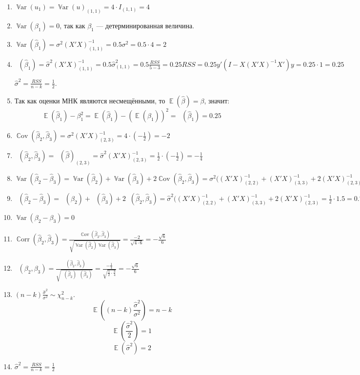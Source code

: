 \documentclass[12pt]{article}
\DeclareMathOperator{\Cov}{\mathbb{C}ov}
\DeclareMathOperator{\Corr}{\mathbb{C}orr}
\DeclareMathOperator{\Var}{\mathbb{V}ar}
\DeclareMathOperator{\hVar}{\widehat{\Var}}
\DeclareMathOperator{\hCov}{\widehat{\Cov}}
\DeclareMathOperator{\hCorr}{\widehat{\Corr}}
\DeclareMathOperator{\E}{\mathbb{E}}
\newcommand{\hb}{\hat{\beta}}
\newcommand{\RSS}{RSS}
\begin{document}
\begin{problem}
\begin{sol}
\begin{enumerate}
\item $\Var(u_1)=\Var(u)_{(1,1)}=4\cdot I_{(1,1)}=4$
\item $\Var(\beta_1)=0$, так как $\beta_1$ — детерминированная величина.
\item $\Var(\hb_1)=\sigma^2(X'X)^{-1}_{(1,1)}=0.5\sigma^2=0.5\cdot 4=2$
\item $\hVar(\hb_1)=\hat\sigma^2(X'X)^{-1}_{(1,1)}=0.5\hat\sigma^2_{(1,1)}=0.5\frac{\RSS}{5-3}=0.25\RSS=0.25y'(I-X(X'X)^{-1}X')y=0.25\cdot 1=0.25$

$\hat\sigma^2=\frac{\RSS}{n-k}=\frac12$.

\item Так как оценки МНК являются несмещёнными, то $\E(\hb)=\beta$, значит:
\[
\E(\hb_1)-\beta_1^2=\E(\hb_1)-(\E(\hb_1))^2=\hVar(\hb_1)=0.25
\]

\item $\Cov(\hb_2,\hb_3)=\sigma^2(X'X)^{-1}_{(2,3)}=4\cdot\left(-\frac12\right)=-2$
\item $\hCov(\hb_2,\hb_3)=\hVar(\hb)_{(2,3)}=\hat\sigma^2(X'X)^{-1}_{(2,3)}=\frac{1}{2}\cdot\left(-\frac12\right)=-\frac14$

\item $\Var(\hb_2-\hb_3)=\Var(\hb_2)+\Var(\hb_3)+2\Cov(\hb_2,\hb_3)=\sigma^2((X'X)^{-1}_{(2,2)}+(X'X)^{-1}_{(3,3)}+2(X'X)^{-1}_{(2,3)}=4(1+1.5+2\cdot(-0.5))=6$

\item $\hVar(\hb_2-\hb_3)=\hVar(\hb_2)+\hVar(\hb_3)+2\hCov(\hb_2,\hb_3)=\hat\sigma^2((X'X)^{-1}_{(2,2)}+(X'X)^{-1}_{(3,3)}+2(X'X)^{-1}_{(2,3)}=\frac{1}{2}\cdot1.5=0.75$

\item $\Var(\beta_2-\beta_3)=0$

\item $\Corr(\hb_2,\hb_3)=\frac{\Cov(\hb_2,\hb_3)}{\sqrt{\Var(\hb_2)\Var(\hb_3)}}=\frac{-2}{\sqrt{4\cdot6}}=-\frac{\sqrt6}{6}$

\item $\hCorr(\beta_2,\beta_3)=\frac{\hCov(\hb_2,\hb_3)}{\sqrt{\hVar(\hb_2)\hVar(\hb_3)}}=\frac{-\frac14}{\sqrt{\frac12\cdot\frac34}}=-\frac{\sqrt6}{6}$

\item $(n-k)\frac{\hat\sigma^2}{\sigma^2}\sim\chi^2_{n-k}$.
\[
\E\left((n-k)\frac{\hat\sigma^2}{\sigma^2}\right)=n-k
\]
\[
\E\left(\frac{\hat\sigma^2}{2}\right)=1
\]
\[
\E(\hat\sigma^2)=2
\]

\item $\hat\sigma^2=\frac{\RSS}{n-k}=\frac{1}{2}$

\end{enumerate}

\end{sol}
\end{problem}
\end{document}
